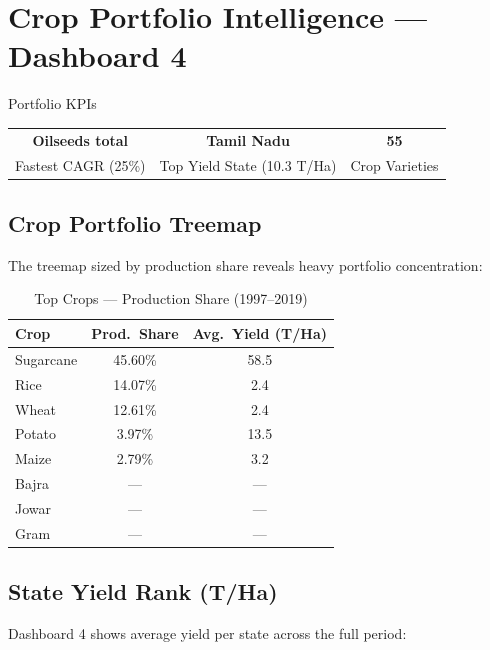 \documentclass[10pt]{article}
\begin{document}
\section{Crop Portfolio Intelligence — Dashboard 4}

\begin{kpibox}{Portfolio KPIs}
  \begin{center}
    \begin{tabular}{ccc}
      \large\textcolor{kpiblue}{\textbf{Oilseeds total}} &
      \large\textcolor{kpiblue}{\textbf{Tamil Nadu}} &
      \large\textcolor{kpiblue}{\textbf{55}} \\[2pt]
      \small Fastest CAGR (25\%) & \small Top Yield State (10.3 T/Ha) & \small Crop Varieties
    \end{tabular}
  \end{center}
\end{kpibox}

\subsection{Crop Portfolio Treemap}
The treemap sized by production share reveals heavy portfolio concentration:

\begin{table}[H]
  \centering
  \caption{Top Crops — Production Share (1997–2019)}
  \label{tab:portfolio}
  \small
  \begin{tabular}{lcc}
    \toprule
    \textbf{Crop} & \textbf{Prod.\ Share} & \textbf{Avg.\ Yield (T/Ha)} \\
    \midrule
    Sugarcane    & 45.60\% & 58.5 \\
    Rice         & 14.07\% &  2.4 \\
    Wheat        & 12.61\% &  2.4 \\
    Potato       &  3.97\% & 13.5 \\
    Maize        &  2.79\% &  3.2 \\
    Bajra        & --- & --- \\
    Jowar        & --- & --- \\
    Gram         & --- & --- \\
    \bottomrule
  \end{tabular}
\end{table}

\subsection{State Yield Rank (T/Ha)}
Dashboard 4 shows average yield per state across the full period:
\end{document}
